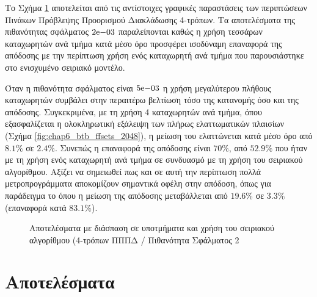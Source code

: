Το Σχήμα \ref{fig:chap6_optimized_serial_4way_ipc} αποτελείται από τις αντίστοιχες γραφικές παραστάσεις των περιπτώσεων Πινάκων Πρόβλεψης Προορισμού Διακλάδωσης 4-τρόπων. Τα αποτελέσματα της πιθανότητας σφάλματος $2\mathrm{e}{-03}$ παραλείπονται καθώς η χρήση τεσσάρων καταχωρητών ανά τμήμα κατά μέσο όρο προσφέρει ισοδύναμη επαναφορά της απόδοσης με την περίπτωση χρήση ενός καταχωρητή ανά τμήμα που παρουσιάστηκε στο ενισχυμένο σειριακό μοντέλο.
\par
Όταν η πιθανότητα σφάλματος είναι $5\mathrm{e}{-03}$ η χρήση μεγαλύτερου πλήθους καταχωρητών συμβάλει στην περαιτέρω βελτίωση τόσο της κατανομής όσο και της απόδοσης. Συγκεκριμένα, με τη χρήση 4 καταχωρητών ανά τμήμα, όπου εξασφαλίζεται η ολοκληρωτική εξάλειψη των πλήρως ελαττωματικών πλαισίων (Σχήμα \ref{fig:chap6_btb_ffsets_2048}), η μείωση του \ipc ελαττώνεται κατά μέσο όρο από $8.1\%$ σε $2.4\%$. Συνεπώς η επαναφορά της απόδοσης είναι $70\%$, από $52.9\%$ που ήταν με τη χρήση ενός καταχωρητή ανά τμήμα σε συνδυασμό με τη χρήση του σειριακού αλγορίθμου. Αξίζει να σημειωθεί πως και σε αυτή την περίπτωση πολλά μετροπρογράμματα αποκομίζουν σημαντικά οφέλη στην απόδοση, όπως για παράδειγμα το  όπου η μείωση της απόδοσης μεταβάλλεται από $19.6\%$ σε $3.3\%$ (επαναφορά κατά $83.1\%$).

\begin{figure}[!t]
    \centering
    \caption{Αποτελέσματα με διάσπαση σε υποτμήματα και χρήση του σειριακού αλγορίθμου (4-τρόπων ΠΠΠΔ / Πιθανότητα Σφάλματος 2}
    \label{fig:chap6_optimized_serial_4way_ipc}
\end{figure}


\section{Αποτελέσματα \mcpat}
\label{chap6_mcpatResults}

